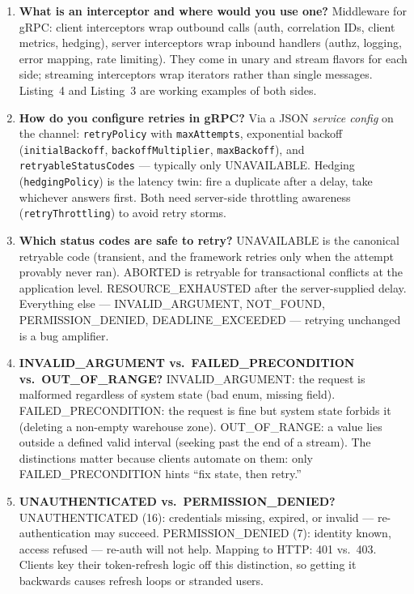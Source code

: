 \begin{enumerate}[label=\textbf{Q\arabic*.}, leftmargin=1.5cm]
        (the token) authenticate the RPC; gRPC composes the two.
  \item \textbf{What is an interceptor and where would you use one?}
        Middleware for gRPC: client interceptors wrap outbound calls (auth,
        correlation IDs, client metrics, hedging), server interceptors wrap
        inbound handlers (authz, logging, error mapping, rate limiting). They
        come in unary and stream flavors for each side; streaming interceptors
        wrap iterators rather than single messages. Listing~4 and Listing~3 are
        working examples of both sides.
  \item \textbf{How do you configure retries in gRPC?}
        Via a JSON \emph{service config} on the channel:
        \texttt{retryPolicy} with \texttt{maxAttempts}, exponential backoff
        (\texttt{initialBackoff}, \texttt{backoffMultiplier},
        \texttt{maxBackoff}), and \texttt{retryableStatusCodes} --- typically
        only UNAVAILABLE. Hedging (\texttt{hedgingPolicy}) is the latency
        twin: fire a duplicate after a delay, take whichever answers first.
        Both need server-side throttling awareness (\texttt{retryThrottling})
        to avoid retry storms.
  \item \textbf{Which status codes are safe to retry?}
        UNAVAILABLE is the canonical retryable code (transient, and the
        framework retries only when the attempt provably never ran). ABORTED is
        retryable for transactional conflicts at the application level.
        RESOURCE\_EXHAUSTED after the server-supplied delay. Everything else ---
        INVALID\_ARGUMENT, NOT\_FOUND, PERMISSION\_DENIED, DEADLINE\_EXCEEDED
        --- retrying unchanged is a bug amplifier.
  \item \textbf{INVALID\_ARGUMENT vs.\ FAILED\_PRECONDITION vs.\
        OUT\_OF\_RANGE?}
        INVALID\_ARGUMENT: the request is malformed regardless of system state
        (bad enum, missing field). FAILED\_PRECONDITION: the request is fine
        but system state forbids it (deleting a non-empty warehouse zone).
        OUT\_OF\_RANGE: a value lies outside a defined valid interval (seeking
        past the end of a stream). The distinctions matter because clients
        automate on them: only FAILED\_PRECONDITION hints ``fix state, then
        retry.''
  \item \textbf{UNAUTHENTICATED vs.\ PERMISSION\_DENIED?}
        UNAUTHENTICATED (16): credentials missing, expired, or invalid ---
        re-authentication may succeed. PERMISSION\_DENIED (7): identity known,
        access refused --- re-auth will not help. Mapping to HTTP: 401 vs.\ 403.
        Clients key their token-refresh logic off this distinction, so getting
        it backwards causes refresh loops or stranded users.


\end{enumerate}
